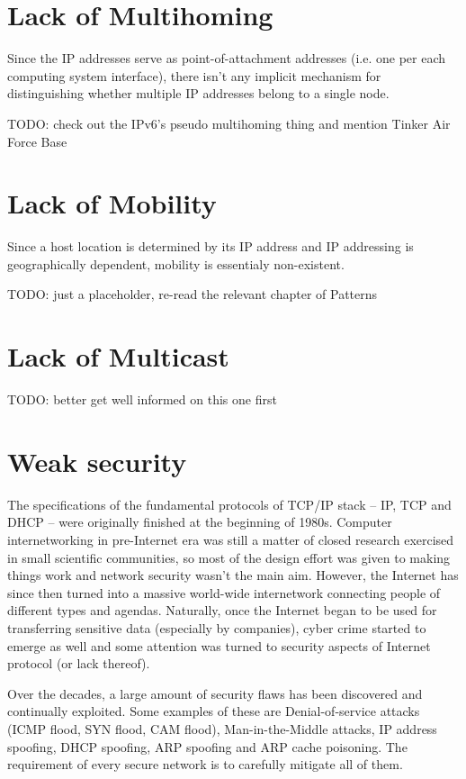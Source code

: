     \section{Lack of Multihoming}

        Since the IP addresses serve as point-of-attachment addresses (i.e. one per each computing system interface), there isn't any implicit mechanism for distinguishing whether multiple IP addresses belong to a single node.

        TODO: check out the IPv6's pseudo multihoming thing and mention Tinker Air Force Base

    \section{Lack of Mobility}

        Since a host location is determined by its IP address and IP addressing is geographically dependent, mobility is essentialy non-existent.

        TODO: just a placeholder, re-read the relevant chapter of Patterns

    \section{Lack of Multicast}

        TODO: better get well informed on this one first

    \section{Weak security}
        The specifications of the fundamental protocols of TCP/IP stack -- IP, TCP and DHCP -- were originally finished at the beginning of 1980s. Computer internetworking in pre-Internet era was still a matter of closed research exercised in small scientific communities, so most of the design effort was given to making things work and network security wasn't the main aim. However, the Internet has since then turned into a massive world-wide internetwork connecting people of different types and agendas. Naturally, once the Internet began to be used for transferring sensitive data (especially by companies), cyber crime started to emerge as well and some attention was turned to security aspects of Internet protocol (or lack thereof).

        Over the decades, a large amount of security flaws has been discovered and continually exploited. Some examples of these are Denial-of-service attacks (ICMP flood, SYN flood, CAM flood), Man-in-the-Middle attacks, IP address spoofing, DHCP spoofing, ARP spoofing and ARP cache poisoning. The requirement of every secure network is to carefully mitigate all of them.

